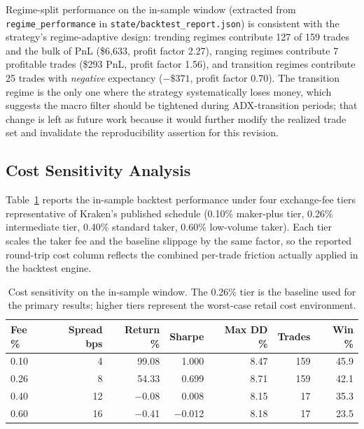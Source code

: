 \documentclass{article}
\begin{document}
Regime-split performance on the in-sample window (extracted from \texttt{regime\_performance} in \texttt{state/backtest\_report.json}) is consistent with the strategy's regime-adaptive design: trending regimes contribute 127 of 159 trades and the bulk of PnL (\$6{,}633, profit factor 2.27), ranging regimes contribute 7 profitable trades (\$293 PnL, profit factor 1.56), and transition regimes contribute 25 trades with \emph{negative} expectancy ($-\$371$, profit factor 0.70). The transition regime is the only one where the strategy systematically loses money, which suggests the macro filter should be tightened during ADX-transition periods; that change is left as future work because it would further modify the realized trade set and invalidate the reproducibility assertion for this revision.

\subsection{Cost Sensitivity Analysis}

Table~\ref{tab:cost_sens} reports the in-sample backtest performance under four exchange-fee tiers representative of Kraken's published schedule (0.10\% maker-plus tier, 0.26\% intermediate tier, 0.40\% standard taker, 0.60\% low-volume taker).
Each tier scales the taker fee and the baseline slippage by the same factor, so the reported round-trip cost column reflects the combined per-trade friction actually applied in the backtest engine.

\begin{table}[h]
\centering
\caption{Cost sensitivity on the in-sample window. The 0.26\% tier is the baseline used for the primary results; higher tiers represent the worst-case retail cost environment.}
\label{tab:cost_sens}
\small
\begin{tabular}{@{}lrrrrrr@{}}
\toprule
\textbf{Fee \%} & \textbf{Spread bps} & \textbf{Return \%} & \textbf{Sharpe} & \textbf{Max DD \%} & \textbf{Trades} & \textbf{Win \%} \\
\midrule
0.10 & \phantom{0}4  & 99.08 & $\phantom{-}$1.000 & 8.47 & 159 & 45.9 \\
0.26 & \phantom{0}8  & 54.33 & $\phantom{-}$0.699 & 8.71 & 159 & 42.1 \\
0.40 & 12 & $-$0.08 & $\phantom{-}$0.008 & 8.15 & \phantom{0}17 & 35.3 \\
0.60 & 16 & $-$0.41 & $-$0.012 & 8.18 & \phantom{0}17 & 23.5 \\
\bottomrule
\end{tabular}
\end{table}
\end{document}
